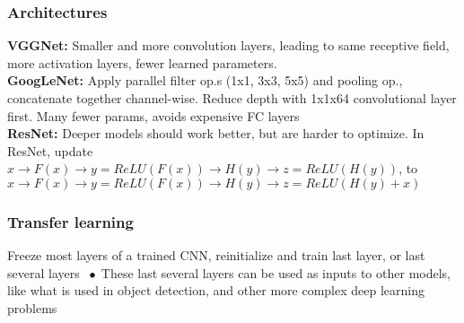 \documentclass[9pt]{extarticle}
\newcommand*\bspace{$\; \bullet \;$}
\begin{document}
\subsubsection{Architectures}
\textbf{VGGNet:} Smaller and more convolution layers, leading to same receptive field, more activation layers, fewer learned parameters.\\
\textbf{GoogLeNet:} Apply parallel filter op.s (1x1, 3x3, 5x5) and pooling op., concatenate together channel-wise. Reduce depth with 1x1x64 convolutional layer first. Many fewer params, avoids expensive FC layers\\
\textbf{ResNet:} Deeper models should work better, but are harder to optimize. In ResNet, update $x \rightarrow F(x) \rightarrow y = ReLU(F(x)) \rightarrow H(y) \rightarrow z = ReLU(H(y))$, to $x \rightarrow F(x) \rightarrow y = ReLU(F(x)) \rightarrow H(y) \rightarrow z = ReLU(H(y) + x)$

\subsubsection{Transfer learning}
Freeze most layers of a trained CNN, reinitialize and train last layer, or last several layers \bspace These last several layers can be used as inputs to other models, like what is used in object detection, and other more complex deep learning problems
\end{document}

